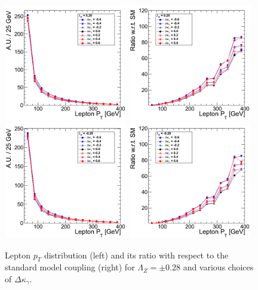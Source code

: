 \begin{figure}[h!t]
  {\centering
    \includegraphics[width=0.48\textwidth]{figs/LeptonpT_028.png}
    \includegraphics[width=0.48\textwidth]{figs/LeptonpT_028_ratio.png}
    \includegraphics[width=0.48\textwidth]{figs/LeptonpT_m028.png}
    \includegraphics[width=0.48\textwidth]{figs/LeptonpT_m028_ratio.png}
    \caption{Lepton $p_T$ distribution (left) and its ratio with respect to 
    the standard model coupling (right) for $\Lambda_Z = \pm 0.28$ and various choices of $\Delta{\kappa_\gamma}$.}
    \label{fig:ww_LeptonpT_atgcRatio028}}
\end{figure}
